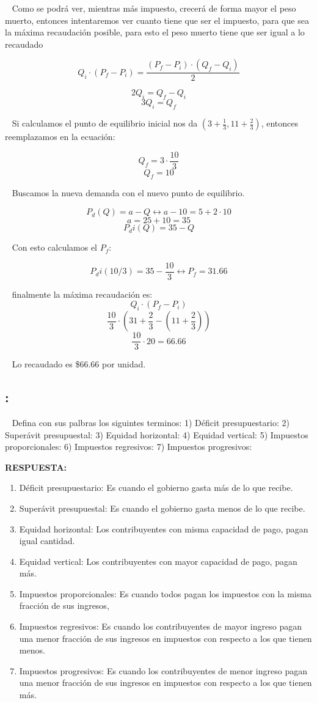 \documentclass[
  letterpaper,
  DIV=11,
  numbers=noendperiod]{scrreport}
\providecommand{\tightlist}{%
  \setlength{\itemsep}{0pt}\setlength{\parskip}{0pt}}\usepackage{longtable,booktabs,array}
\begin{document}
~ Como se podrá ver, mientras más impuesto, crecerá de forma mayor el
peso muerto, entonces intentaremos ver cuanto tiene que ser el impuesto,
para que sea la máxima recaudación posible, para esto el peso muerto
tiene que ser igual a lo recaudado

\[
Q_i\cdot (P_f-P_i)=\frac{(P_f-P_i)\cdot (Q_f-Q_i)}{2}
\]

\[
2Q_i=Q_f-Q_i
\] \[
3Q_i=Q_f
\]

~ Si calculamos el punto de equilibrio inicial nos da
\((3+\frac{1}{3},11+\frac{2}{3})\), entonces reemplazamos en la
ecuación:

\[
Q_f=3\cdot\frac{10}{3}
\] \[
Q_f=10
\]

~ Buscamos la nueva demanda con el nuevo punto de equilibrio.

\[
P_d(Q)=a-Q \longleftrightarrow a-10=5+2\cdot10\]
\] \[
a=25+10=35
\] \[
P_di(Q)=35-Q
\]

~ Con esto calculamos el \(P_f\):

\[
P_di(10/3)=35-\frac{10}{3}\leftrightarrow P_f=31.66
\]

~ finalmente la máxima recaudación es: \[
Q_i\cdot (P_f-P_i)
\] \[
\frac{10}{3}\cdot (31+\frac{2}{3}-(11+\frac{2}{3}))
\] \[
\frac{10}{3}\cdot 20=66.66
\]

~ Lo recaudado es \$66.66 por unidad.

\hypertarget{section-36}{%
\subsection{:}\label{section-36}}

~ Defina con sus palbras los siguintes terminos: 1) Déficit
presupuestario: 2) Superávit presupuestal: 3) Equidad horizontal: 4)
Equidad vertical: 5) Impuestos proporcionales: 6) Impuestos regresivos:
7) Impuestos progresivos:

\textbf{RESPUESTA:}

\begin{enumerate}
\def\labelenumi{\arabic{enumi})}
\tightlist
\item
  Déficit presupuestario: Es cuando el gobierno gasta más de lo que
  recibe.
\item
  Superávit presupuestal: Es cuando el gobierno gasta menos de lo que
  recibe.
\item
  Equidad horizontal: Los contribuyentes con misma capacidad de pago,
  pagan igual cantidad.
\item
  Equidad vertical: Los contribuyentes con mayor capacidad de pago,
  pagan más.
\item
  Impuestos proporcionales: Es cuando todos pagan los impuestos con la
  misma fracción de sus ingresos,
\item
  Impuestos regresivos: Es cuando los contribuyentes de mayor ingreso
  pagan una menor fracción de sus ingresos en impuestos con respecto a
  los que tienen menos.
\item
  Impuestos progresivos: Es cuando los contribuyentes de menor ingreso
  pagan una menor fracción de sus ingresos en impuestos con respecto a
  los que tienen más.
\end{enumerate}
\end{document}
